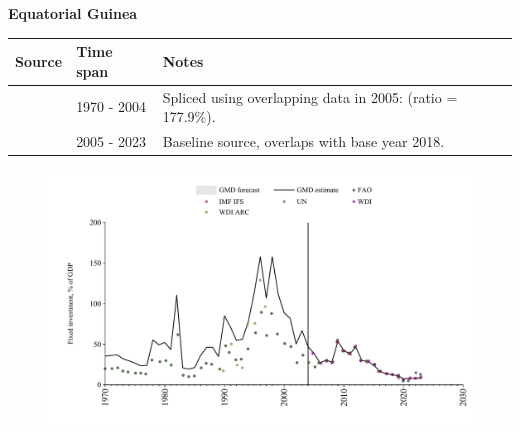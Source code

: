 \documentclass[12pt,a4paper,landscape]{article}
\begin{document}
\begin{adjustbox}{max totalsize={\paperwidth}{\paperheight},center}
\begin{minipage}[t][\textheight][t]{\textwidth}
\vspace*{0.5cm}
{}
\begin{center}
{\Large\bfseries Equatorial Guinea}
\end{center}
\vspace{0.5cm}
\begin{table}[H]
\centering
\small
\begin{tabular}{|l|l|l|}
\hline
\textbf{Source} & \textbf{Time span} & \textbf{Notes} \\
\hline
\rowcolor{white}\cite{UN}& 1970 - 2004 &Spliced using overlapping data in 2005: (ratio = 177.9\%).\\
\rowcolor{lightgray}\cite{WDI}& 2005 - 2023 &Baseline source, overlaps with base year 2018.\\
\hline
\end{tabular}
\end{table}
\begin{figure}[H]
\centering
\includegraphics[width=\textwidth,height=0.6\textheight,keepaspectratio]{graphs/GNQ_finv_GDP.pdf}
\end{figure}
\end{minipage}
\end{adjustbox}
\end{document}
